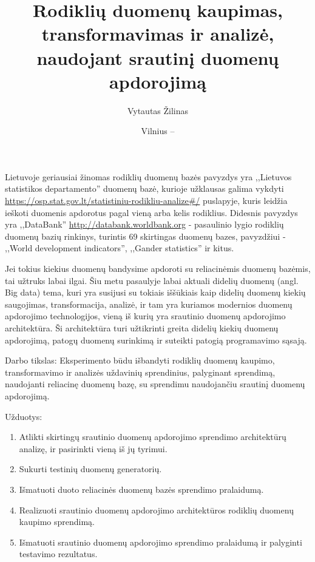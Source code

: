 \documentclass{VUMIFPSkursinis}
\title{Rodiklių duomenų kaupimas, transformavimas ir analizė, naudojant srautinį duomenų apdorojimą}
\author{Vytautas Žilinas}
\date{Vilnius – \the\year}
\begin{document}
	
\maketitle
\cleardoublepage{}
\setcounter{page}{2}

\tableofcontents


Lietuvoje geriausiai žinomas rodiklių duomenų bazės pavyzdys yra ,,Lietuvos statistikos departamento'' duomenų bazė, kurioje užklausas galima vykdyti
\url{https://osp.stat.gov.lt/statistiniu-rodikliu-analize#/} puslapyje, kuris leidžia ieškoti duomenis apdorotus pagal vieną arba kelis rodiklius. 
Didesnis pavyzdys yra ,,DataBank'' \url{http://databank.worldbank.org} - pasaulinio lygio rodiklių duomenų bazių rinkinys, turintis 69 skirtingas 
duomenų bazes, pavyzdžiui - ,,World development indicators'', ,,Gander statistics'' ir kitus\cite{databank-stats}. \par
Jei tokius kiekius duomenų bandysime apdoroti su reliacinėmis duomenų bazėmis, tai užtruks labai ilgai.
Šiu metu pasaulyje labai aktuali didelių duomenų (angl. Big data) tema, kuri yra susijusi su tokiais iššūkiais kaip didelių duomenų kiekių saugojimas, 
transformacija, analizė, ir tam yra kuriamos modernios duomenų apdorojimo technologijos, vieną iš kurių yra srautinio duomenų apdorojimo architektūra.
Ši architektūra turi užtikrinti greita didelių kiekių duomenų apdorojimą, patogų duomenų surinkimą ir suteikti patogią programavimo sąsają.    

Darbo tikslas: Eksperimento būdu išbandyti rodiklių duomenų kaupimo, transformavimo ir analizės uždavinių sprendinius, palyginant sprendimą, naudojanti reliacinę duomenų bazę, su sprendimu naudojančiu srautinį duomenų apdorojimą.

Užduotys:
\begin{enumerate}
    \item Atlikti skirtingų srautinio duomenų apdorojimo sprendimo architektūrų analizę, ir pasirinkti vieną iš jų tyrimui.
    \item Sukurti testinių duomenų generatorių.
    \item Išmatuoti duoto reliacinės duomenų bazės sprendimo pralaidumą.
    \item Realizuoti srautinio duomenų apdorojimo architektūros rodiklių duomenų kaupimo sprendimą.
    \item Išmatuoti srautinio duomenų apdorojimo sprendimo pralaidumą ir palyginti testavimo rezultatus.
\end{enumerate}
\end{document}
